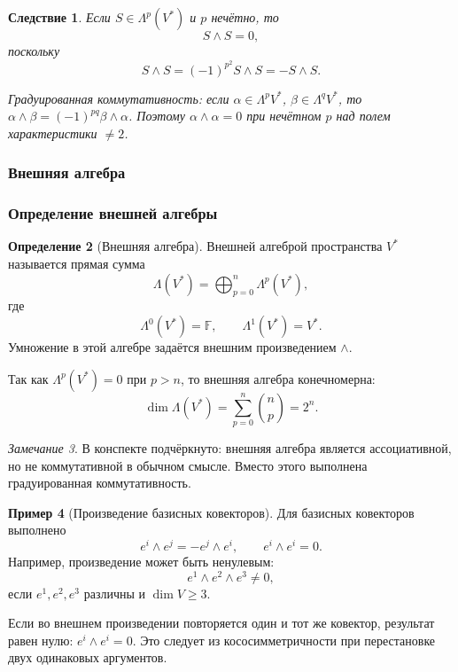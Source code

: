 \documentclass[12pt,a4paper]{article}
\theoremstyle{definition}
\newtheorem{definition}{Определение}[section]
\newtheorem{example}[definition]{Пример}
\theoremstyle{plain}
\newtheorem{corollary}[definition]{Следствие}
\theoremstyle{remark}
\newtheorem{remark}[definition]{Замечание}
\newenvironment{knowledgefix}{\begin{clarifybox}}{\end{clarifybox}}
\newcommand{\F}{\mathbb{F}}
\begin{document}
\begin{corollary}
Если $S\in\Lambda^p(V^*)$ и $p$ нечётно, то
\[
    S\wedge S=0,
\]
поскольку
\[
    S\wedge S=(-1)^{p^2}S\wedge S=-S\wedge S.
\]
\begin{knowledgefix}
Градуированная коммутативность: если \(\alpha\in\Lambda^p V^*\), \(\beta\in\Lambda^q V^*\), то \(\alpha\wedge\beta=(-1)^{pq}\beta\wedge\alpha\). Поэтому \(\alpha\wedge\alpha=0\) при нечётном \(p\) над полем характеристики \(\ne2\).
\end{knowledgefix}
\end{corollary}

\subsubsection{Внешняя алгебра}

\subsubsection*{Определение внешней алгебры}

\begin{definition}[Внешняя алгебра]
Внешней алгеброй пространства $V^*$ называется прямая сумма
\[
    \Lambda(V^*)=\bigoplus_{p=0}^{n}\Lambda^p(V^*),
\]
где
\[
    \Lambda^0(V^*)=\F,
    \qquad
    \Lambda^1(V^*)=V^*.
\]
Умножение в этой алгебре задаётся внешним произведением $\wedge$.
\end{definition}

Так как $\Lambda^p(V^*)=0$ при $p>n$, то внешняя алгебра конечномерна:
\[
    \dim\Lambda(V^*)=
    \sum_{p=0}^{n}\binom{n}{p}=2^n.
\]

\begin{remark}
В конспекте подчёркнуто: внешняя алгебра является ассоциативной, но не коммутативной в обычном смысле. Вместо этого выполнена градуированная коммутативность.
\end{remark}

\begin{example}[Произведение базисных ковекторов]
Для базисных ковекторов выполнено
\[
    e^i\wedge e^j=-e^j\wedge e^i,
    \qquad
    e^i\wedge e^i=0.
\]
Например, произведение может быть ненулевым:
\[
    e^1\wedge e^2\wedge e^3\ne 0,
\]
если $e^1,e^2,e^3$ различны и $\dim V\ge 3$.
\begin{knowledgefix}
Если во внешнем произведении повторяется один и тот же ковектор, результат равен нулю: \(e^i\wedge e^i=0\). Это следует из кососимметричности при перестановке двух одинаковых аргументов.
\end{knowledgefix}
\end{example}
\end{document}
